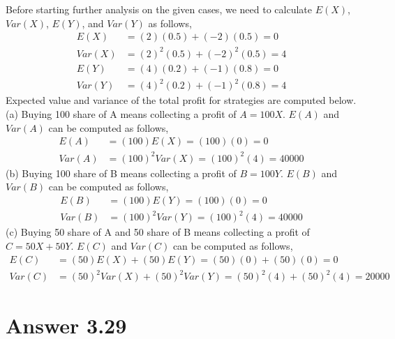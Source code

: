 \documentclass[12pt]{article}
\begin{document}
Before starting further analysis on the given cases, we need to calculate $E(X)$, $Var(X)$, $E(Y)$, and $Var(Y)$ as follows,
\begin{equation}
\begin{split}
	E(X) & = (2)(0.5) + (-2)(0.5) = 0 \\
	Var(X) & = (2)^2(0.5) + (-2)^2(0.5) = 4 \\
	E(Y) & = (4)(0.2) + (-1)(0.8) = 0 \\
	Var(Y) & = (4)^2(0.2) + (-1)^2(0.8) = 4
\end{split}
\end{equation}
Expected value and variance of the total profit for strategies are computed below. \\
(a) Buying 100 share of A means collecting a profit of $A = 100X$. $E(A)$ and $Var(A)$ can be computed as follows,
\begin{equation}
\begin{split}
	E(A) & = (100)E(X) = (100)(0) = 0 \\
	Var(A) & = (100)^2Var(X) = (100)^2(4) = 40000
\end{split}
\end{equation}
(b) Buying 100 share of B means collecting a profit of $B = 100Y$. $E(B)$ and $Var(B)$ can be computed as follows,
\begin{equation}
\begin{split}
	E(B) & = (100)E(Y) = (100)(0) = 0 \\
	Var(B) & = (100)^2Var(Y) = (100)^2(4) = 40000
\end{split}
\end{equation}
(c) Buying 50 share of A and 50 share of B means collecting a profit of $C = 50X + 50Y$. $E(C)$ and $Var(C)$ can be computed as follows,
\begin{equation}
\begin{split}
	E(C) & = (50)E(X) + (50)E(Y) = (50)(0) + (50)(0) = 0 \\
	Var(C) & = (50)^2Var(X) + (50)^2Var(Y) = (50)^2(4) + (50)^2(4) = 20000
\end{split}
\end{equation}

\section*{Answer 3.29}
\end{document}
